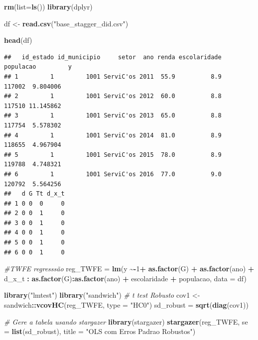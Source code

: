 \documentclass[
]{article}
\author{}
\date{\vspace{-2.5em}}
\newenvironment{Shaded}{\begin{snugshade}}{\end{snugshade}}
\newcommand{\AttributeTok}[1]{\textcolor[rgb]{0.13,0.29,0.53}{#1}}
\newcommand{\CommentTok}[1]{\textcolor[rgb]{0.56,0.35,0.01}{\textit{#1}}}
\newcommand{\DecValTok}[1]{\textcolor[rgb]{0.00,0.00,0.81}{#1}}
\newcommand{\FunctionTok}[1]{\textcolor[rgb]{0.13,0.29,0.53}{\textbf{#1}}}
\newcommand{\NormalTok}[1]{#1}
\newcommand{\OtherTok}[1]{\textcolor[rgb]{0.56,0.35,0.01}{#1}}
\newcommand{\SpecialCharTok}[1]{\textcolor[rgb]{0.81,0.36,0.00}{\textbf{#1}}}
\newcommand{\StringTok}[1]{\textcolor[rgb]{0.31,0.60,0.02}{#1}}
\begin{document}
\begin{Shaded}
\begin{Highlighting}[]
\FunctionTok{rm}\NormalTok{(}\AttributeTok{list=}\FunctionTok{ls}\NormalTok{())}
\FunctionTok{library}\NormalTok{(dplyr)}

\NormalTok{df }\OtherTok{\textless{}{-}} \FunctionTok{read.csv}\NormalTok{(}\StringTok{"base\_stagger\_did.csv"}\NormalTok{)}

\FunctionTok{head}\NormalTok{(df)}
\end{Highlighting}
\end{Shaded}

\begin{verbatim}
##   id_estado id_municipio     setor  ano renda escolaridade populacao         y
## 1         1         1001 ServiC'os 2011  55.9          8.9    117002  9.804006
## 2         1         1001 ServiC'os 2012  60.0          8.8    117510 11.145862
## 3         1         1001 ServiC'os 2013  65.0          8.8    117754  5.578302
## 4         1         1001 ServiC'os 2014  81.0          8.9    118655  4.967904
## 5         1         1001 ServiC'os 2015  78.0          8.9    119788  4.748321
## 6         1         1001 ServiC'os 2016  77.0          9.0    120792  5.564256
##   d G Tt d_x_t
## 1 0 0  0     0
## 2 0 0  1     0
## 3 0 0  1     0
## 4 0 0  1     0
## 5 0 0  1     0
## 6 0 0  1     0
\end{verbatim}

\begin{Shaded}
\begin{Highlighting}[]
\CommentTok{\#TWFE regresssão}
\NormalTok{reg\_TWFE }\OtherTok{=} \FunctionTok{lm}\NormalTok{(y }\SpecialCharTok{\textasciitilde{}{-}}\DecValTok{1}\SpecialCharTok{+} \FunctionTok{as.factor}\NormalTok{(G) }\SpecialCharTok{+} \FunctionTok{as.factor}\NormalTok{(ano) }\SpecialCharTok{+}\NormalTok{ d\_x\_t }\SpecialCharTok{:} \FunctionTok{as.factor}\NormalTok{(G)}\SpecialCharTok{:}\FunctionTok{as.factor}\NormalTok{(ano) }\SpecialCharTok{+}\NormalTok{ escolaridade }\SpecialCharTok{+}\NormalTok{ populacao, }\AttributeTok{data =}\NormalTok{ df)}

\FunctionTok{library}\NormalTok{(}\StringTok{"lmtest"}\NormalTok{)}
\FunctionTok{library}\NormalTok{(}\StringTok{"sandwich"}\NormalTok{)}
\CommentTok{\# t test Robusto}
\NormalTok{cov1 }\OtherTok{\textless{}{-}}\NormalTok{ sandwich}\SpecialCharTok{::}\FunctionTok{vcovHC}\NormalTok{(reg\_TWFE, }\AttributeTok{type =} \StringTok{"HC0"}\NormalTok{)}
\NormalTok{sd\_robust }\OtherTok{=} \FunctionTok{sqrt}\NormalTok{(}\FunctionTok{diag}\NormalTok{(cov1))}

\CommentTok{\# Gere a tabela usando stargazer}
\FunctionTok{library}\NormalTok{(stargazer)}
\FunctionTok{stargazer}\NormalTok{(reg\_TWFE, }\AttributeTok{se =} \FunctionTok{list}\NormalTok{(sd\_robust),}
\AttributeTok{title =} \StringTok{"OLS com Erros Padrao Robustos"}\NormalTok{)}
\end{Highlighting}
\end{Shaded}
\end{document}
